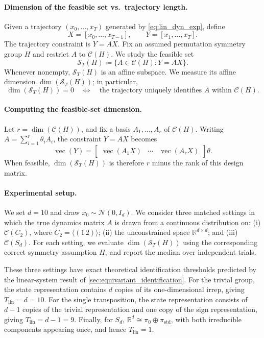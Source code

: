 \documentclass[11pt]{article}
\theoremstyle{plain}
\theoremstyle{definition}
\theoremstyle{remark}
\begin{document}
\paragraph{Dimension of the feasible set vs.\ trajectory length.}
Given a trajectory \((x_0,\ldots,x_T)\) generated by
\eqref{eq:lin_dyn_exp}, define
\[
X=[x_0,\ldots,x_{T-1}],
\qquad
Y=[x_1,\ldots,x_T].
\]
The trajectory constraint is \(Y=AX\). Fix an assumed permutation symmetry
group \(H\) and restrict \(A\) to \(\mathcal C(H)\). We study the feasible set
\begin{equation}
\mathcal S_T(H)
\coloneqq
\{A\in\mathcal C(H):Y=AX\}.
\label{eq:feasible_set_def}
\end{equation}
Whenever nonempty, \(\mathcal S_T(H)\) is an affine subspace. We measure its
affine dimension \(\dim(\mathcal S_T(H))\); in particular,
\[
\dim(\mathcal S_T(H))=0
\quad\Longleftrightarrow\quad
\text{the trajectory uniquely identifies \(A\) within \(\mathcal C(H)\)}.
\]

\paragraph{Computing the feasible-set dimension.}
Let \(r=\dim(\mathcal C(H))\), and fix a basis
\(A_1,\ldots,A_r\) of \(\mathcal C(H)\). Writing
\(A=\sum_{i=1}^r\theta_iA_i\), the constraint \(Y=AX\) becomes
\[
\operatorname{vec}(Y)
=
\begin{bmatrix}
\operatorname{vec}(A_1X)&\cdots&\operatorname{vec}(A_rX)
\end{bmatrix}\theta.
\]
When feasible, \(\dim(\mathcal S_T(H))\) is therefore \(r\) minus the rank of
this design matrix.

\paragraph{Experimental setup.}
We set \(d=10\) and draw \(x_0\sim\mathcal N(0,I_d)\). We consider three
matched settings in which the true dynamics matrix \(A\) is drawn from a
continuous distribution on: (i) \(\mathcal C(C_2)\), where
\(C_2=\langle(1\,2)\rangle\); (ii) the unconstrained space
\(\mathbb{R}^{d\times d}\); and (iii) \(\mathcal C(S_d)\). For each setting,
we evaluate \(\dim(\mathcal S_T(H))\) using the corresponding correct symmetry
assumption \(H\), and report the median over independent trials.

These three settings have exact theoretical identification thresholds predicted
by the linear-system result of \cref{sec:equivariant_identification}. For the
trivial group, the state representation contains \(d\) copies of its
one-dimensional irrep, giving \(T_{\mathrm{lin}}=d=10\). For the single
transposition, the state representation consists of \(d-1\) copies of the
trivial representation and one copy of the sign representation, giving
\(T_{\mathrm{lin}}=d-1=9\). Finally, for \(S_d\),
\(\mathbb{R}^d\cong\pi_0\oplus\pi_{\mathrm{std}}\), with both irreducible
components appearing once, and hence \(T_{\mathrm{lin}}=1\).
\end{document}

